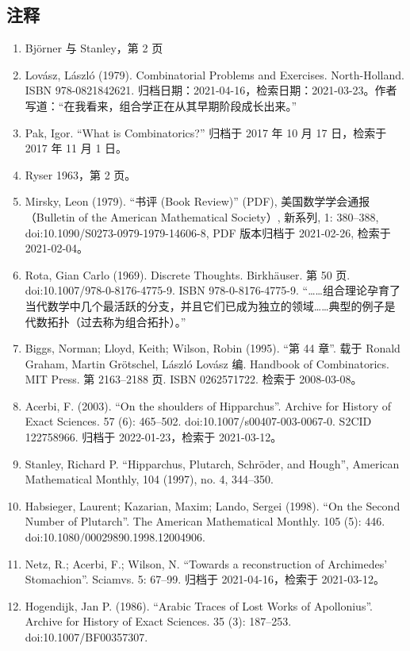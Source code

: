 \subsection{注释}
\begin{enumerate}
  \item Björner 与 Stanley，第 2 页  
  \item Lovász, László (1979). Combinatorial Problems and Exercises. North-Holland. ISBN 978-0821842621. 归档日期：2021-04-16，检索日期：2021-03-23。作者写道：“在我看来，组合学正在从其早期阶段成长出来。”  
  \item Pak, Igor. “What is Combinatorics?” 归档于 2017 年 10 月 17 日，检索于 2017 年 11 月 1 日。  
  \item Ryser 1963，第 2 页。  
  \item Mirsky, Leon (1979). “书评 (Book Review)” (PDF), 美国数学学会通报（Bulletin of the American Mathematical Society）, 新系列, 1: 380–388, doi:10.1090/S0273-0979-1979-14606-8, PDF 版本归档于 2021-02-26, 检索于 2021-02-04。  
  \item Rota, Gian Carlo (1969). Discrete Thoughts. Birkhäuser. 第 50 页. doi:10.1007/978-0-8176-4775-9. ISBN 978-0-8176-4775-9.  
  “……组合理论孕育了当代数学中几个最活跃的分支，并且它们已成为独立的领域……典型的例子是代数拓扑（过去称为组合拓扑）。”  
  \item Biggs, Norman; Lloyd, Keith; Wilson, Robin (1995). “第 44 章”. 载于 Ronald Graham, Martin Grötschel, László Lovász 编. Handbook of Combinatorics. MIT Press. 第 2163–2188 页. ISBN 0262571722. 检索于 2008-03-08。  
  \item Acerbi, F. (2003). “On the shoulders of Hipparchus”. Archive for History of Exact Sciences. 57 (6): 465–502. doi:10.1007/s00407-003-0067-0. S2CID 122758966. 归档于 2022-01-23，检索于 2021-03-12。  
  \item Stanley, Richard P. “Hipparchus, Plutarch, Schröder, and Hough”, American Mathematical Monthly, 104 (1997), no. 4, 344–350.  
  \item Habsieger, Laurent; Kazarian, Maxim; Lando, Sergei (1998). “On the Second Number of Plutarch”. The American Mathematical Monthly. 105 (5): 446. doi:10.1080/00029890.1998.12004906.  
  \item Netz, R.; Acerbi, F.; Wilson, N. “Towards a reconstruction of Archimedes' Stomachion”. Sciamvs. 5: 67–99. 归档于 2021-04-16，检索于 2021-03-12。  
  \item Hogendijk, Jan P. (1986). “Arabic Traces of Lost Works of Apollonius”. Archive for History of Exact Sciences. 35 (3): 187–253. doi:10.1007/BF00357307.  

\end{enumerate}
